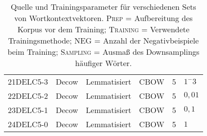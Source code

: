 \begin{table}[h]
\begin{tabular}{@{}llllll@{}}
  21DELC5-3 & Decow & Lemmatisiert & CBOW & 5 & $1^-3$ \\
  22DELC5-2 & Decow & Lemmatisiert & CBOW & 5 & $0,01$ \\
  23DELC5-1 & Decow & Lemmatisiert & CBOW & 5 & $0,1$ \\
  24DELC5-0 & Decow & Lemmatisiert & CBOW & 5 & $1$ \\
  \bottomrule[1.25pt]
\end{tabular}
\caption[Trainingsparameter der Wortkontextvektoren]{Quelle und Trainingsparameter für verschiedenen Sets von Wortkontextvektoren.
\textsc{Prep} = Aufbereitung des Korpus vor dem Training; \textsc{Training} = Verwendete Trainingsmethode; \textsc{NEG} = Anzahl der
Negativbeispiele beim Training; \textsc{Sampling} = Ausmaß des Downsamplings häufiger Wörter.}
\end{table}
